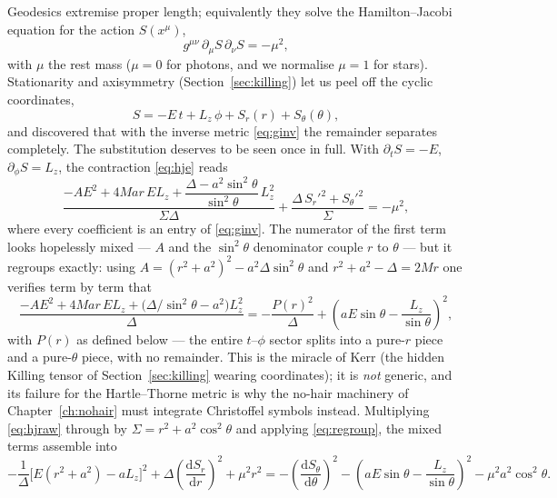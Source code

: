 Geodesics extremise proper length; equivalently they solve the
Hamilton--Jacobi equation for the action $S(x^\mu)$,
\begin{equation}
g^{\mu\nu}\,\partial_\mu S\,\partial_\nu S = -\mu^2,
\label{eq:hje}
\end{equation}
with $\mu$ the rest mass ($\mu = 0$ for photons, and we normalise
$\mu = 1$ for stars). Stationarity and axisymmetry
(Section~\ref{sec:killing}) let us peel off the cyclic coordinates,
\begin{equation}
S = -E\,t + L_z\,\phi + S_r(r) + S_\theta(\theta),
\label{eq:ansatz}
\end{equation}
and \citet{Carter1968} discovered that with the inverse metric
\eqref{eq:ginv} the remainder separates completely. The substitution
deserves to be seen once in full. With $\partial_t S = -E$,
$\partial_\phi S = L_z$, the contraction \eqref{eq:hje} reads
\begin{equation}
\frac{-A E^2 + 4Mar\,E L_z
+ \dfrac{\Delta - a^2\sin^2\theta}{\sin^2\theta}\,L_z^2}{\Sigma\Delta}
+ \frac{\Delta\,S_r'^2 + S_\theta'^2}{\Sigma} = -\mu^2 ,
\label{eq:hjraw}
\end{equation}
where every coefficient is an entry of \eqref{eq:ginv}. The numerator of
the first term looks hopelessly mixed — $A$ and the $\sin^2\theta$
denominator couple $r$ to $\theta$ — but it regroups exactly:
using $A = (r^2+a^2)^2 - a^2\Delta\sin^2\theta$ and
$r^2 + a^2 - \Delta = 2Mr$ one verifies term by term that
\begin{equation}
\frac{-A E^2 + 4Mar\,EL_z + \bigl(\Delta/\sin^2\theta -
a^2\bigr)L_z^2}{\Delta}
= -\frac{P(r)^2}{\Delta}
+ \left(aE\sin\theta - \frac{L_z}{\sin\theta}\right)^2 ,
\label{eq:regroup}
\end{equation}
with $P(r)$ as defined below — the entire $t$--$\phi$ sector splits
into a pure-$r$ piece and a pure-$\theta$ piece, with no remainder.
This is the miracle of Kerr (the hidden Killing tensor of
Section~\ref{sec:killing} wearing coordinates); it is \emph{not}
generic, and its failure for the Hartle--Thorne metric is why the
no-hair machinery of Chapter~\ref{ch:nohair} must integrate
Christoffel symbols instead. Multiplying \eqref{eq:hjraw} through by
$\Sigma = r^2 + a^2\cos^2\theta$ and applying \eqref{eq:regroup}, the
mixed terms assemble into
\begin{equation}
-\frac{1}{\Delta}\bigl[E(r^2+a^2) - a L_z\bigr]^2
+ \Delta\left(\frac{\mathrm{d}S_r}{\mathrm{d}r}\right)^2
+ \mu^2 r^2
= -\left(\frac{\mathrm{d}S_\theta}{\mathrm{d}\theta}\right)^2
- \left(aE\sin\theta - \frac{L_z}{\sin\theta}\right)^2
- \mu^2 a^2\cos^2\theta .
\label{eq:separated}
\end{equation}
